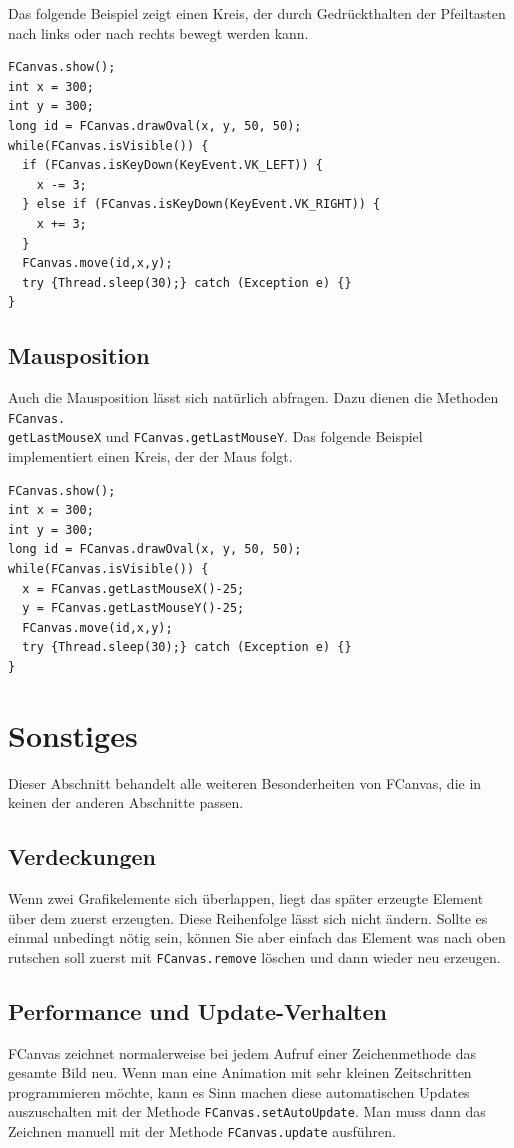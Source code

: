 \documentclass{article}
\begin{document}
Das folgende Beispiel zeigt einen Kreis, der durch Gedrückthalten der Pfeiltasten nach links oder nach rechts bewegt werden kann.
\begin{lstlisting}
FCanvas.show();
int x = 300;
int y = 300;
long id = FCanvas.drawOval(x, y, 50, 50);
while(FCanvas.isVisible()) {
  if (FCanvas.isKeyDown(KeyEvent.VK_LEFT)) {
    x -= 3;
  } else if (FCanvas.isKeyDown(KeyEvent.VK_RIGHT)) {
    x += 3;
  }
  FCanvas.move(id,x,y);
  try {Thread.sleep(30);} catch (Exception e) {}
}
\end{lstlisting}

\subsection{Mausposition}
Auch die Mausposition lässt sich natürlich abfragen. Dazu dienen die Methoden {\tt FCanvas.\\getLastMouseX} und {\tt FCanvas.getLastMouseY}. Das folgende Beispiel implementiert einen Kreis, der der Maus folgt.

\begin{lstlisting}
FCanvas.show();
int x = 300;
int y = 300;
long id = FCanvas.drawOval(x, y, 50, 50);
while(FCanvas.isVisible()) {
  x = FCanvas.getLastMouseX()-25;
  y = FCanvas.getLastMouseY()-25;
  FCanvas.move(id,x,y);
  try {Thread.sleep(30);} catch (Exception e) {}
}
\end{lstlisting}

\section{Sonstiges}
Dieser Abschnitt behandelt alle weiteren Besonderheiten von FCanvas, die in keinen der anderen Abschnitte passen.
\subsection{Verdeckungen}
Wenn zwei Grafikelemente sich überlappen, liegt das später erzeugte Element über dem zuerst erzeugten. Diese Reihenfolge lässt sich nicht ändern. Sollte es einmal unbedingt nötig sein, können Sie aber einfach das Element was nach oben rutschen soll zuerst mit {\tt FCanvas.remove} löschen und dann wieder neu erzeugen.

\subsection{Performance und Update-Verhalten}
FCanvas zeichnet normalerweise bei jedem Aufruf einer Zeichenmethode das gesamte Bild neu. Wenn man eine Animation mit sehr kleinen Zeitschritten programmieren möchte, kann es Sinn machen diese automatischen Updates auszuschalten mit der Methode {\tt FCanvas.setAutoUpdate}. Man muss dann das Zeichnen manuell mit der Methode {\tt FCanvas.update} ausführen.
\end{document}
